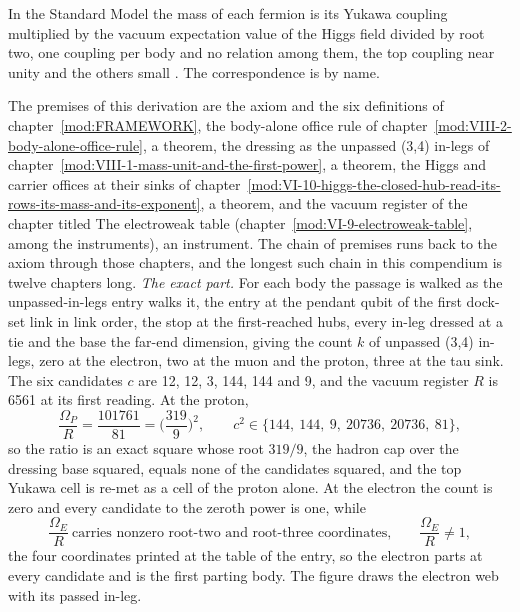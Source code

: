 \begin{chbridge}
In the Standard Model the mass of each fermion is its Yukawa coupling multiplied by the vacuum expectation value of the Higgs field divided by root two, one coupling per body and no relation among them, the top coupling near unity and the others small \cite{Weinberg1967,Peskin1995}. The correspondence is by name.
\end{chbridge}
\begin{chproof}
The premises of this derivation are the axiom and the six definitions of chapter~\ref{mod:FRAMEWORK}, the body-alone office rule of chapter~\ref{mod:VIII-2-body-alone-office-rule}, a theorem, the dressing as the unpassed (3,4) in-legs of chapter~\ref{mod:VIII-1-mass-unit-and-the-first-power}, a theorem, the Higgs and carrier offices at their sinks of chapter~\ref{mod:VI-10-higgs-the-closed-hub-read-its-rows-its-mass-and-its-exponent}, a theorem, and the vacuum register of the chapter titled The electroweak table (chapter~\ref{mod:VI-9-electroweak-table}, among the instruments), an instrument. The chain of premises runs back to the axiom through those chapters, and the longest such chain in this compendium is twelve chapters long.
\textit{The exact part.} For each body the passage is walked as the unpassed-in-legs entry walks it, the entry at the pendant qubit of the first dock-set link in link order, the stop at the first-reached hubs, every in-leg dressed at a tie and the base the far-end dimension, giving the count $k$ of unpassed (3,4) in-legs, zero at the electron, two at the muon and the proton, three at the tau sink. The six candidates $c$ are 12, 12, 3, 144, 144 and 9, and the vacuum register $R$ is 6561 at its first reading. At the proton,
\begin{equation} \frac{\Omega_{P}}{R} = \frac{101761}{81} = \Big(\frac{319}{9}\Big)^{2}, \qquad c^{2} \in \{144,\ 144,\ 9,\ 20736,\ 20736,\ 81\}, \end{equation}
so the ratio is an exact square whose root $319/9$, the hadron cap over the dressing base squared, equals none of the candidates squared, and the top Yukawa cell is re-met as a cell of the proton alone. At the electron the count is zero and every candidate to the zeroth power is one, while
\begin{equation} \frac{\Omega_{E}}{R} \ \text{carries nonzero root-two and root-three coordinates,} \qquad \frac{\Omega_{E}}{R} \neq 1 , \end{equation}
the four coordinates printed at the table of the entry, so the electron parts at every candidate and is the first parting body. The figure draws the electron web with its passed in-leg.

\end{chproof}
